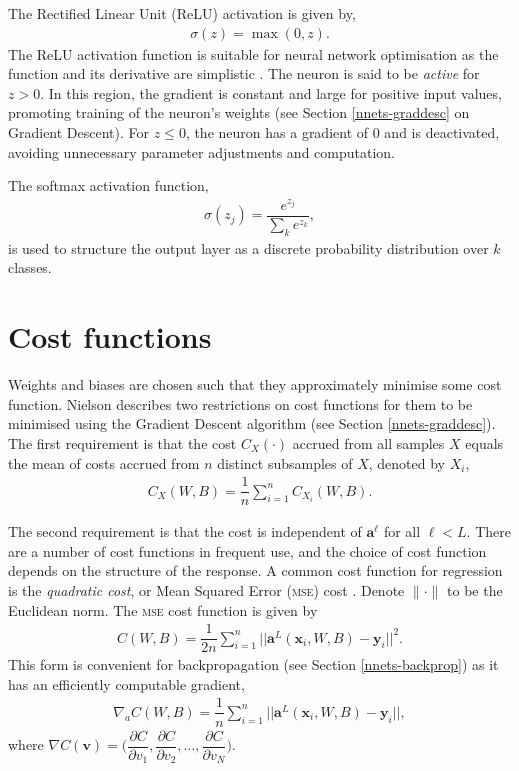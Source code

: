 The Rectified Linear Unit (ReLU) activation is given by,
\begin{align}
	\sigma(z) = \max(0, z).
\end{align}
The ReLU activation function is suitable for neural network optimisation as the function and its derivative are simplistic \cite{Goodfellow-et-al-2016}. The neuron is said to be \textit{active} for $z > 0$. In this region, the gradient is constant and large for positive input values, promoting training of the neuron's weights (see Section \ref{nnets-graddesc} on Gradient Descent). For $z \leq 0$, the neuron has a gradient of 0 and is deactivated, avoiding unnecessary parameter adjustments and computation. 

The softmax activation function,
\begin{align}
	\sigma(z_j) = \dfrac{e^{z_j}}{\sum_ke^{z_k}},
\end{align}
is used to structure the output layer as a discrete probability distribution over $k$ classes.


\section{Cost functions}\label{nnets-cost}

Weights and biases are chosen such that they approximately minimise some cost function. Nielson \cite{Nielson2015} describes two restrictions on cost functions for them to be minimised using the Gradient Descent algorithm (see Section \ref{nnets-graddesc}). The first requirement is that the cost $C_X(\cdot)$ accrued from all samples $X$ equals the mean of costs accrued from $n$ distinct subsamples of $X$, denoted by $X_i$,
\begin{align}
	C_X(W, B) = \dfrac{1}{n}\sum_{i=1}^n C_{X_i}(W,B).
\end{align}

The second requirement is that the cost is independent of $\mathbf{a}^\ell$ for all $\ell < L$. There are a number of cost functions in frequent use, and the choice of cost function depends on the structure of the response. A common cost function for regression is the \textit{quadratic cost}, or Mean Squared Error (\textsc{mse}) cost \cite{Nielson2015}. Denote $\|\cdot\|$ to be the Euclidean norm. The \textsc{mse} cost function is given by
\begin{align}
	C(W,B) = \dfrac{1}{2n}\sum_{i=1}^n||\mathbf{a}^L(\mathbf{x}_i,W,B) - \mathbf{y}_i ||^2.
\end{align}
This form is convenient for backpropagation (see Section \ref{nnets-backprop}) as it has an efficiently computable gradient,
\begin{align}
	\nabla_aC(W,B) = \dfrac{1}{n}\sum_{i=1}^n||\mathbf{a}^L(\mathbf{x}_i,W,B) - \mathbf{y}_i ||,
\end{align}
where $\nabla C(\mathbf{v}) = \Big(\dfrac{\partial C}{\partial v_1}, \dfrac{\partial C}{\partial v_2},\ldots, \dfrac{\partial C}{\partial v_N}\Big)$.

